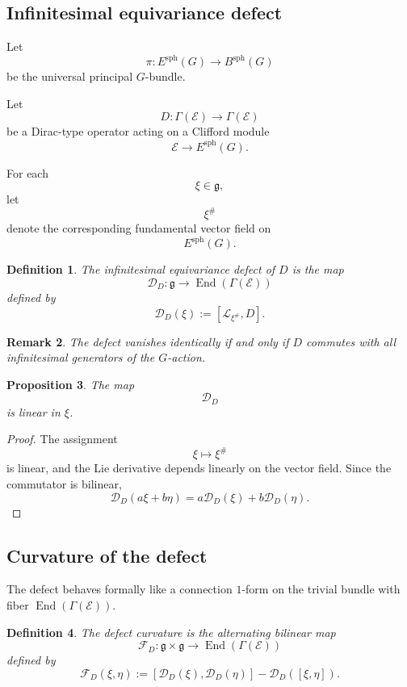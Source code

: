 \documentclass[11pt]{amsart}
\newtheorem{definition}{Definition}[section]
\newtheorem{proposition}[definition]{Proposition}
\newtheorem{remark}[definition]{Remark}
\begin{document}
\subsection{Infinitesimal equivariance defect}

Let
\[
\pi:E^{\mathrm{sph}}(G)\to B^{\mathrm{sph}}(G)
\]
be the universal principal \(G\)-bundle.

Let
\[
D:\Gamma(\mathcal E)\to\Gamma(\mathcal E)
\]
be a Dirac-type operator acting on a Clifford module
\[
\mathcal E\to E^{\mathrm{sph}}(G).
\]

For each
\[
\xi\in\mathfrak g,
\]
let
\[
\xi^\#
\]
denote the corresponding fundamental vector field on
\[
E^{\mathrm{sph}}(G).
\]

\begin{definition}
The \emph{infinitesimal equivariance defect} of \(D\) is the map
\[
\mathcal D_D:\mathfrak g
\longrightarrow
\operatorname{End}(\Gamma(\mathcal E))
\]
defined by
\[
\mathcal D_D(\xi)
:=
[\mathcal L_{\xi^\#},D].
\]
\end{definition}

\begin{remark}
The defect vanishes identically if and only if \(D\) commutes with all
infinitesimal generators of the \(G\)-action.
\end{remark}

\begin{proposition}
The map
\[
\mathcal D_D
\]
is linear in \(\xi\).
\end{proposition}

\begin{proof}
The assignment
\[
\xi\mapsto \xi^\#
\]
is linear, and the Lie derivative depends linearly on the vector field.
Since the commutator is bilinear,
\[
\mathcal D_D(a\xi+b\eta)
=
a\mathcal D_D(\xi)
+
b\mathcal D_D(\eta).
\]
\end{proof}

\subsection{Curvature of the defect}

The defect behaves formally like a connection \(1\)-form on the trivial bundle
with fiber \(\operatorname{End}(\Gamma(\mathcal E))\).

\begin{definition}
The \emph{defect curvature} is the alternating bilinear map
\[
\mathcal F_D:
\mathfrak g\times\mathfrak g
\longrightarrow
\operatorname{End}(\Gamma(\mathcal E))
\]
defined by
\[
\mathcal F_D(\xi,\eta)
:=
[\mathcal D_D(\xi),\mathcal D_D(\eta)]
-
\mathcal D_D([\xi,\eta]).
\]
\end{definition}
\end{document}
